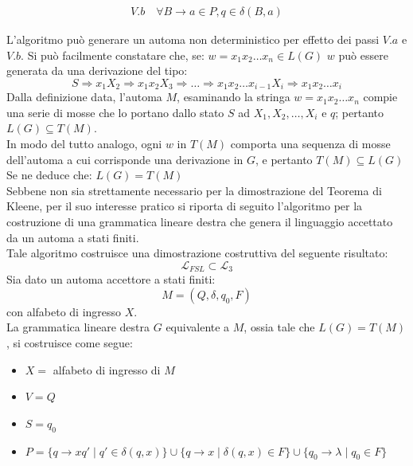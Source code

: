 \documentclass[12pt]{report}
\begin{document}
{{{\begin{itemize}
\begin{itemize}
\begin{align*}
					V. b \quad \forall B \to a \in P, q \in \delta(B, a)
				\end{align*}
			\end{itemize}
			L'algoritmo può generare un automa non deterministico per effetto dei passi $V.a$ e $V.b$. Si può facilmente constatare che, se: $w = x_1x_2\dots x_n \in L(G)$ $w$ può essere generata da una derivazione del tipo:
			\[
			S \Rightarrow x_1X_2 \Rightarrow x_1x_2X_3 \Rightarrow \dots \Rightarrow x_1x_2\dots x_{i-1}X_i \Rightarrow x_1x_2\dots x_i
			\]
			Dalla definizione data, l'automa $M$, esaminando la stringa $w = x_1x_2\dots x_n$ compie una serie di mosse che lo portano dallo stato $S$ ad $X_1, X_2, \dots , X_i$ e $q$; pertanto $L(G) \subseteq T(M)$. \\
			In modo del tutto analogo, ogni $w$ in $T(M)$ comporta una sequenza di mosse dell'automa a cui corrisponde una derivazione in $G$, e pertanto $T(M) \subseteq L(G)$ \\
			Se ne deduce che: $L(G) = T(M)$ \\
			Sebbene non sia strettamente necessario per la dimostrazione del Teorema di Kleene, per il suo interesse pratico si riporta di seguito l'algoritmo per la costruzione di una grammatica lineare destra che genera il linguaggio accettato da un automa a stati finiti. \\
			Tale algoritmo costruisce una dimostrazione costruttiva del seguente risultato:
			\[
			\mathcal{L}_{FSL} \subset \mathcal{L}_3
			\]
			Sia dato un automa accettore a stati finiti:
			\[
			M = (Q, \delta, q_0, F)
			\]
			con alfabeto di ingresso $X$. \\
			La grammatica lineare destra $G$ equivalente a $M$, ossia tale che $L(G) = T(M)$, si costruisce come segue:
			\begin{itemize}
				\item $X = $ alfabeto di ingresso di $M$
				\item $V = Q$
				\item $S = q_0$
				\item $P = \{q \to xq' \mid q' \in \delta(q, x)\} \cup \{q \to x \mid \delta(q, x) \in F\} \cup \{q_0 \to \lambda \mid q_0 \in F\}$
			\end{itemize}
		\end{itemize}
		}
		}
	}
\end{document}

